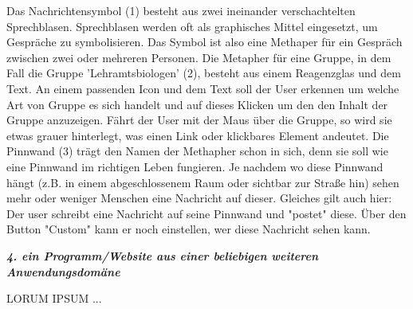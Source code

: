 \documentclass[a4paper,10pt]{article}
\begin{document}
Das Nachrichtensymbol (1) besteht aus zwei ineinander verschachtelten Sprechblasen. Sprechblasen werden oft als graphisches Mittel eingesetzt, um Gespräche zu symbolisieren. Das Symbol ist also eine Methaper für ein Gespräch zwischen zwei oder mehreren Personen. \newline
Die Metapher für eine Gruppe, in dem Fall die Gruppe 'Lehramtsbiologen' (2), besteht aus einem Reagenzglas und dem Text. An einem passenden Icon und dem Text soll der User erkennen um welche Art von Gruppe es sich handelt und auf dieses Klicken um den den Inhalt der Gruppe anzuzeigen. Fährt der User mit der Maus über die Gruppe, so wird sie etwas grauer hinterlegt, was einen Link oder klickbares Element andeutet. \newline
Die Pinnwand (3) trägt den Namen der Methapher schon in sich, denn sie soll wie eine Pinnwand im richtigen Leben fungieren. Je nachdem wo diese Pinnwand hängt (z.B. in einem abgeschlossenem Raum oder sichtbar zur Straße hin) sehen mehr oder weniger Menschen eine Nachricht auf dieser. Gleiches gilt auch hier: Der user schreibt eine Nachricht auf seine Pinnwand und "postet" diese. Über den Button "Custom" kann er noch einstellen, wer diese Nachricht sehen kann. \newline


\textbf{\textit{4. ein Programm/Website aus einer beliebigen weiteren Anwendungsdomäne}} \newline

LORUM IPSUM ... \newline
\end{document}
